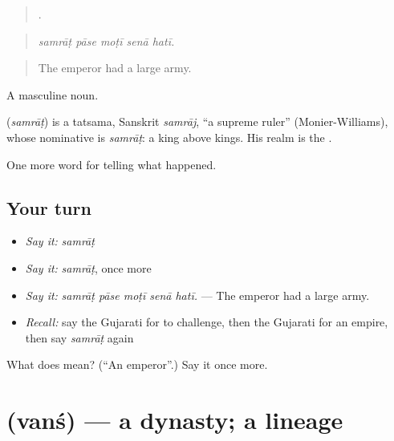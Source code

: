 \begin{quote}
    .
\end{quote}

\begin{quote}
\emph{samrāṭ pāse moṭī senā hatī.}
\end{quote}

\begin{quote}
The emperor had a large army.
\end{quote}

A masculine noun.

\begin{cousinweb}
\textbf{} (\emph{samrāṭ}) is a tatsama, Sanskrit \emph{samrāj}, \textquotedblleft{}a supreme ruler\textquotedblright{} (Monier-Williams), whose nominative is \emph{samrāṭ}: a king above kings. His realm is the \textbf{}.
\end{cousinweb}

\begin{grammarlens}[title={What you've built}]
One more word for telling what happened.
\end{grammarlens}

\subsection*{Your turn}
\begin{itemize}
\raggedright
  \item \emph{Say it:} \emph{samrāṭ}
  \item \emph{Say it:} \emph{samrāṭ}, once more
  \item \emph{Say it:} \emph{samrāṭ pāse moṭī senā hatī.} — The emperor had a large army.
  \item \emph{Recall:} say the Gujarati for to challenge, then the Gujarati for an empire, then say \emph{samrāṭ} again
\end{itemize}

\begin{tcolorbox}[breakable,colback=teal!4,colframe=teal!35!black,title={Before you move on}]
What does  mean? (\textquotedblleft{}An emperor\textquotedblright{}.) Say it once more.
\end{tcolorbox}
\section[\texorpdfstring{\gu{વંશ} (vanś)}{વંશ (vanś)}]{ (vanś) — a dynasty; a lineage}

